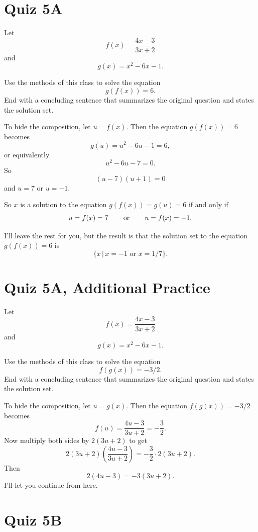 \documentclass{ximera}
\begin{document}
\section{Quiz 5A}

\begin{question} \label{Qpv33f}
Let
\[
  f(x) = \frac{4x-3}{3x+2}
\]
and
\[
   g(x) = x^2  - 6x -1.
\]

Use the methods of this class to solve the equation
\[
   g(f(x)) = 6.
\]
End with a concluding sentence that summarizes the original question and states the solution set.

\begin{explanation}
To hide the composition, let $u=f(x)$. Then the equation $g(f(x))=6$ becomes
\[
     g(u) = u^2 - 6u - 1 = 6,
\]  
or equivalently
\[
   u^2 - 6u - 7 = 0.
\]
So
\[
    (u-7)(u+1)=0
\]
and $u=7$ or $u=-1$.

So $x$ is a solution to the equation $g(f(x)) = g(u) = 6$ if and only if
\[
 u = f(x) = 7 \hskip 0.3 in \text{or} \hskip 0.3 in u = f(x) = -1.
\]

I'll leave the rest for you, but the result is that the solution set to the equation $g(f(x))=6$ is
\[
 \{  x \, | \, x= -1 \text{ or } x = 1/7  \}.
\]

\end{explanation}
\end{question}

\section{Quiz 5A, Additional Practice}
\begin{question} \label{Qp35v33f}
Let
\[
  f(x) = \frac{4x-3}{3x+2}
\]
and
\[
   g(x) = x^2  - 6x -1.
\]

Use the methods of this class to solve the equation
\[
  f(g(x)) = -3/2.
\]
End with a concluding sentence that summarizes the original question and states the solution set.

\begin{explanation}
To hide the composition, let $u=g(x)$. Then the equation $f(g(x))= - 3/2$ becomes
\[
     f(u) = \frac{4u-3}{3u+2} = -\frac{3}{2}.
\]  
Now multiply both sides by $2(3u+2)$ to get
\[
   2(3u+2) \left(  \frac{4u-3}{3u+2}\right) = -\frac{3}{2}\cdot 2(3u+2).
\]
Then
\[
 2(4u-3) = -3(3u+2).
\]
I'll let you continue from here.
\end{explanation}
\end{question}

\section{Quiz 5B}
\end{document}
